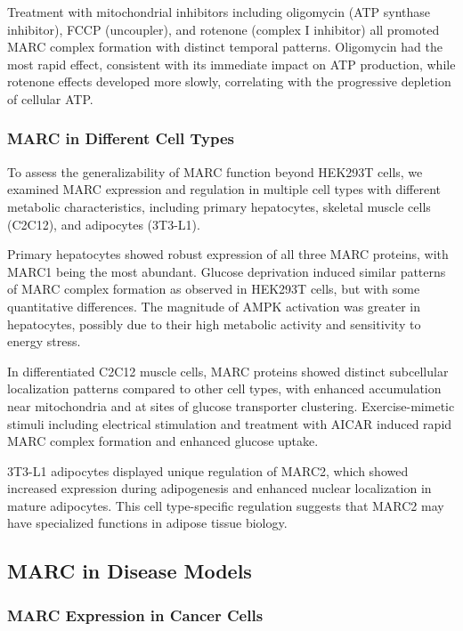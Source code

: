 \documentclass[11pt,a4paper]{article}
\begin{document}
Treatment with mitochondrial inhibitors including oligomycin (ATP synthase inhibitor), FCCP (uncoupler), and rotenone (complex I inhibitor) all promoted MARC complex formation with distinct temporal patterns. Oligomycin had the most rapid effect, consistent with its immediate impact on ATP production, while rotenone effects developed more slowly, correlating with the progressive depletion of cellular ATP.

\subsubsection{MARC in Different Cell Types}

To assess the generalizability of MARC function beyond HEK293T cells, we examined MARC expression and regulation in multiple cell types with different metabolic characteristics, including primary hepatocytes, skeletal muscle cells (C2C12), and adipocytes (3T3-L1).

Primary hepatocytes showed robust expression of all three MARC proteins, with MARC1 being the most abundant. Glucose deprivation induced similar patterns of MARC complex formation as observed in HEK293T cells, but with some quantitative differences. The magnitude of AMPK activation was greater in hepatocytes, possibly due to their high metabolic activity and sensitivity to energy stress.

In differentiated C2C12 muscle cells, MARC proteins showed distinct subcellular localization patterns compared to other cell types, with enhanced accumulation near mitochondria and at sites of glucose transporter clustering. Exercise-mimetic stimuli including electrical stimulation and treatment with AICAR induced rapid MARC complex formation and enhanced glucose uptake.

3T3-L1 adipocytes displayed unique regulation of MARC2, which showed increased expression during adipogenesis and enhanced nuclear localization in mature adipocytes. This cell type-specific regulation suggests that MARC2 may have specialized functions in adipose tissue biology.

\subsection{MARC in Disease Models}

\subsubsection{MARC Expression in Cancer Cells}
\end{document}

